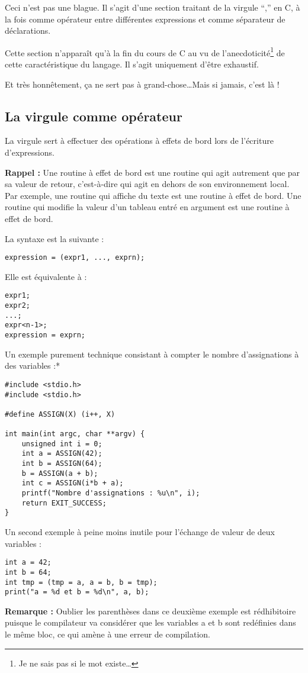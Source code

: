 \documentclass[../../../main.tex]{subfiles}
\begin{document}
Ceci n’est pas une blague. Il s’agit d’une section traitant de la virgule ``,'' en C, à la fois comme
opérateur entre différentes expressions et comme séparateur de déclarations.

Cette section n’apparaît qu’à la fin du cours de C au vu de l’anecdoticité\footnote{Je ne sais pas si le mot existe\dots} de cette caractéristique du
langage. Il s’agit uniquement d’être exhaustif.

Et très honnêtement, ça ne sert pas à grand-chose\dots Mais si jamais, c’est là !
\subsection{La virgule comme opérateur}
La virgule sert à effectuer des opérations à effets de bord lors de l’écriture d’expressions.

\textbf{Rappel :} Une routine à effet de bord est une routine qui agit autrement que par sa valeur de retour,
c’est-à-dire qui agit en dehors de son environnement local. Par exemple, une routine qui affiche du
texte est une routine à effet de bord. Une routine qui modifie la valeur d’un tableau entré en argument
est une routine à effet de bord.

La syntaxe est la suivante :
\begin{verbatim}
expression = (expr1, ..., exprn);
\end{verbatim}
Elle est équivalente à :
\begin{verbatim}
expr1;
expr2;
...;
expr<n-1>;
expression = exprn;
\end{verbatim}
Un exemple purement technique consistant à compter le nombre d’assignations à des variables :*
\begin{verbatim}
#include <stdio.h>
#include <stdio.h>

#define ASSIGN(X) (i++, X)

int main(int argc, char **argv) {
	unsigned int i = 0;
	int a = ASSIGN(42);
	int b = ASSIGN(64);
	b = ASSIGN(a + b);
	int c = ASSIGN(i*b + a);
	printf("Nombre d'assignations : %u\n", i);
	return EXIT_SUCCESS;
}
\end{verbatim}
Un second exemple à peine moins inutile pour l’échange de valeur de deux variables :
\begin{verbatim}
int a = 42;
int b = 64;
int tmp = (tmp = a, a = b, b = tmp);
print("a = %d et b = %d\n", a, b);
\end{verbatim}
\textbf{Remarque :} Oublier les parenthèses dans ce deuxième exemple est rédhibitoire puisque le compilateur
va considérer que les variables a et b sont redéfinies dans le même bloc, ce qui amène à une erreur de
compilation.
\end{document}

